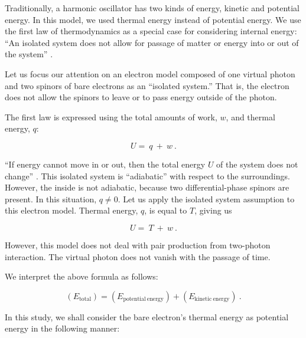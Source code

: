 \documentclass[%
 reprint,
 amsmath,amssymb,
 aps,
]{revtex4-1}
\numberwithin{equation}{section}%
\begin{document}
    Traditionally, a harmonic oscillator has two kinds of energy, kinetic and potential energy. In this model, we used thermal energy instead of potential energy. We use the first law of thermodynamics as a special case for considering internal energy: ``An isolated system does not allow for passage of matter or energy into or out of the system'' \cite{David Ball}.
        
    Let us focus our attention on an electron model composed of one virtual photon and two spinors of bare electrons as an ``isolated system.'' That is, the electron does not allow the spinors to leave or to pass energy outside of the photon.
    
    The first law is expressed using the total amounts of work, $ w $, and thermal energy, $ q $:
    
        \begin{equation}
            U = \ q \ + \ w
            \ .
            \label{e3_U=q+w}
        \end{equation}

    ``If energy cannot move in or out, then the total energy $ U $ of the system does not change'' \cite{David Ball}. This isolated system is ``adiabatic'' with respect to the surroundings. However, the inside is not adiabatic, because two differential-phase spinors are present. In this situation, $ q \neq 0 $. Let us apply the isolated system assumption to this electron model. Thermal energy, $ q $, is equal to $T$, giving us
 
        \begin{equation}
            U = \ T \ + \ w
            \ .
            \label{e3_U=T+w}
        \end{equation}

    However, this model does not deal with pair production from two-photon interaction. The virtual photon does not vanish with the passage of time. 

    We interpret the above formula as follows:

        \begin{equation}
            \left( E_{\mathrm{total}} \right) = \left( E_{\mathrm{potential \ energy}} \right) + \left( E_{\mathrm{kinetic \ energy}} \right)
            \ .
            \label{e3_E_total^2_04}
        \end{equation}

    In this study, we shall consider the bare electron's thermal energy as potential energy in the following manner: 
\end{document}

